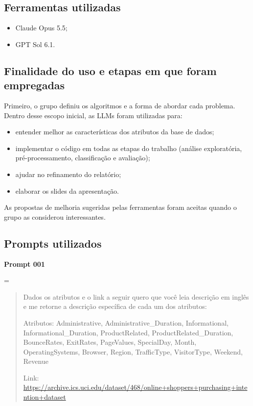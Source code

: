 \documentclass[11pt,a4paper]{article}
\begin{document}
\makeatletter
\newenvironment{prompt}[1]
  {\par\medskip\noindent\textbf{#1}\par\nobreak\@beginparpenalty=\@M
   \begin{quote}\small\renewcommand{\_}{\textunderscore\allowbreak}}
  {\end{quote}}
\makeatother

\subsection*{Ferramentas utilizadas}
\begin{itemize}
  \item Claude Opus 5.5;
  \item GPT Sol 6.1.
\end{itemize}

\subsection*{Finalidade do uso e etapas em que foram empregadas}

Primeiro, o grupo definiu os algoritmos e a forma de abordar cada problema. Dentro desse escopo inicial, as LLMs foram
utilizadas para:
\begin{itemize}
  \item entender melhor as características dos atributos da base de dados;
  \item implementar o código em todas as etapas do trabalho (análise exploratória, pré-processamento, classificação e
        avaliação);
  \item ajudar no refinamento do relatório;
  \item elaborar os slides da apresentação.
\end{itemize}
As propostas de melhoria sugeridas pelas ferramentas foram aceitas quando o grupo as considerou interessantes.

\subsection*{Prompts utilizados}

\begin{prompt}{Prompt 001}
Dados os atributos e o link a seguir quero que você leia descrição em inglês e me retorne a descrição específica de
cada um dos atributos:

Atributos: Administrative, Administrative\_Duration, Informational, Informational\_Duration, ProductRelated,
ProductRelated\_Duration, BounceRates, ExitRates, PageValues, SpecialDay, Month, OperatingSystems, Browser, Region,
TrafficType, VisitorType, Weekend, Revenue

Link: \url{https://archive.ics.uci.edu/dataset/468/online+shoppers+purchasing+intention+dataset}
\end{prompt}
\end{document}
